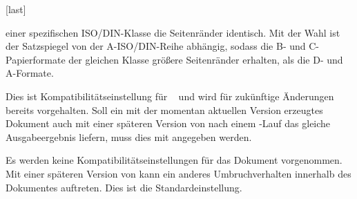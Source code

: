 \begin{Declaration*}{}
\begin{Declaration*}{}
\begin{Declaration*}{}
\begin{Declaration}[v2.03]{}[last]
\begin{values}{}
  einer spezifischen ISO/DIN-Klasse die Seitenränder identisch. Mit der Wahl 
   ist der Satzspiegel von der A-ISO/DIN-Reihe 
  abhängig, sodass die B- und C-Papierformate der gleichen Klasse größere 
  Seitenränder erhalten, als die D- und A-Formate.
\item[\PValue{2.05}]
  Dies ist Kompatibilitätseinstellung für \TUDScript~\vTUDScript{} und wird für 
  zukünftige Änderungen bereits vorgehalten. Soll ein mit der momentan 
  aktuellen Version erzeugtes Dokument auch mit einer späteren Version von 
  \TUDScript nach einem -Lauf das gleiche Ausgabeergebnis 
  liefern, muss dies mit  angegeben werden.
\item[\PValue{last}]
  Es werden keine Kompatibilitätseinstellungen für das Dokument vorgenommen. 
  Mit einer späteren Version von \TUDScript kann ein anderes Umbruchverhalten 
  innerhalb des Dokumentes auftreten. Dies ist die Standardeinstellung.
\end{values}
\end{Declaration}
\end{Declaration*}
\end{Declaration*}
\end{Declaration*}
